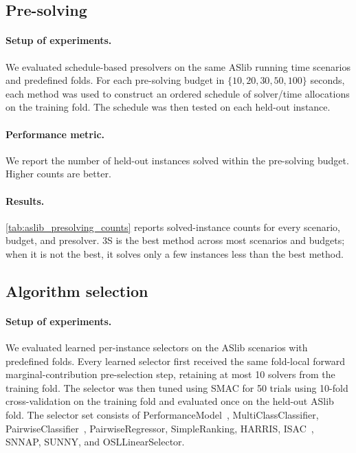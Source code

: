 \clearpage

\subsection{Pre-solving}

\paragraph{Setup of experiments.}
We evaluated schedule-based presolvers on the same ASlib running time scenarios and predefined folds. For each pre-solving budget in $\{10,20,30,50,100\}$ seconds, each method was used to construct an ordered schedule of solver/time allocations on the training fold. The schedule was then tested on each held-out instance.

\paragraph{Performance metric.} We report the number of held-out instances solved within the pre-solving budget. Higher counts are better. 

\paragraph{Results.}
\autoref{tab:aslib_presolving_counts} reports solved-instance counts for every scenario, budget, and presolver. 3S is the best method across most scenarios and budgets; when it is not the best, it solves only a few instances less than the best method. 

\begin{table}[!htbp]
  \centering
  \caption[ASlib pre-solving solved-instance counts]{ASlib pre-solving solved-instance counts. Rows are grouped by pre-solving budget and ASlib scenario; columns are pre-solving methods. Higher is better, and bold entries mark the highest count in each row.}
  {}
  \label{tab:aslib_presolving_counts}
\end{table}
\clearpage

\subsection{Algorithm selection}

\paragraph{Setup of experiments. }
We evaluated learned per-instance selectors on the ASlib scenarios with predefined folds. Every learned selector first received the same fold-local forward marginal-contribution pre-selection step, retaining at most 10 solvers from the training fold. The selector was then tuned using SMAC for 50 trials using 10-fold cross-validation on the training fold and evaluated once on the held-out ASlib fold. The selector set consists of PerformanceModel~\citep{XuEtAl08}, MultiClassClassifier, PairwiseClassifier~\citep{XuEtAl12}, PairwiseRegressor, SimpleRanking, HARRIS, ISAC~\citep{KadEtAl10}, SNNAP, SUNNY, and OSLLinearSelector.

